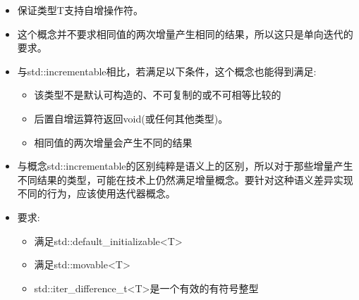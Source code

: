 \begin{itemize}
\item
保证类型T支持自增操作符。

\item
这个概念并不要求相同值的两次增量产生相同的结果，所以这只是单向迭代的要求。

\item
与std::incrementable相比，若满足以下条件，这个概念也能得到满足:

\begin{itemize}
\item
该类型不是默认可构造的、不可复制的或不可相等比较的

\item
后置自增运算符返回void(或任何其他类型)。

\item
相同值的两次增量会产生不同的结果
\end{itemize}

\item
与概念std::incrementable的区别纯粹是语义上的区别，所以对于那些增量产生不同结果的类型，可能在技术上仍然满足增量概念。要针对这种语义差异实现不同的行为，应该使用迭代器概念。

\item
要求:
\begin{itemize}
\item
满足std::default\_initializable<T>

\item
满足std::movable<T>

\item
std::iter\_difference\_t<T>是一个有效的有符号整型
\end{itemize}
\end{itemize}



